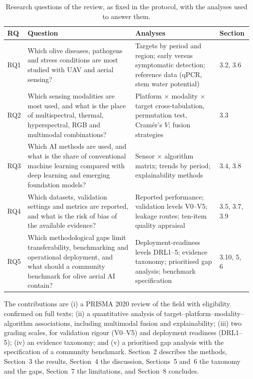 \documentclass[preprint,12pt]{elsarticle}
\begin{document}
\begin{table}[t]
\centering
\caption{Research questions of the review, as fixed in the protocol, with the analyses used to answer them.}
\label{tab:rq}
\footnotesize
\setlength{\tabcolsep}{3pt}
\begin{tabular}{@{}p{0.63cm}p{5.07cm}p{5.71cm}p{1.45cm}@{}}
\toprule
RQ & Question & Analyses & Section \\
\midrule
RQ1 & Which olive diseases, pathogens and stress conditions are most studied with UAV and aerial sensing? & Targets by period and region; early versus symptomatic detection; reference data (qPCR, stem water potential) & 3.2, 3.6 \\
RQ2 & Which sensing modalities are most used, and what is the place of multispectral, thermal, hyperspectral, RGB and multimodal combinations? & Platform $\times$ modality $\times$ target cross-tabulation, permutation test, Cram\'er's $V$; fusion strategies & 3.3 \\
RQ3 & Which AI methods are used, and what is the share of conventional machine learning compared with deep learning and emerging foundation models? & Sensor $\times$ algorithm matrix; trends by period; explainability methods & 3.4, 3.8 \\
RQ4 & Which datasets, validation settings and metrics are reported, and what is the risk of bias of the available evidence? & Reported performance; validation levels V0--V5; leakage routes; ten-item quality appraisal & 3.5, 3.7, 3.9 \\
RQ5 & Which methodological gaps limit transferability, benchmarking and operational deployment, and what should a community benchmark for olive aerial AI contain? & Deployment-readiness levels DRL1--5; evidence taxonomy; prioritised gap analysis; benchmark specification & 3.10, 5, 6 \\
\bottomrule
\end{tabular}
\end{table}
 
The contributions are (i) a PRISMA 2020 review of the field with eligibility confirmed on full texts; (ii) a quantitative analysis of target--platform--modality--algorithm associations, including multimodal fusion and explainability; (iii) two grading scales, for validation rigour (V0--V5) and deployment readiness (DRL1--5); (iv) an evidence taxonomy; and (v) a prioritised gap analysis with the specification of a community benchmark. Section~2 describes the methods, Section~3 the results, Section~4 the discussion, Sections~5 and~6 the taxonomy and the gaps, Section~7 the limitations, and Section~8 concludes.
 
\end{document}
